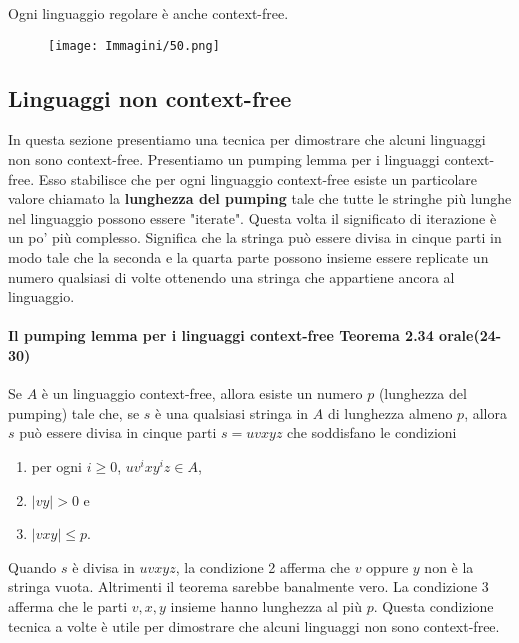 \documentclass{article}
\begin{document}
\begin{tcolorbox}[colback=blue!10!white, colframe=blue!50!black, title=Corollario 2.32]
    Ogni linguaggio regolare è anche context-free.
\end{tcolorbox}

\begin{figure}[H]
    \centering
    \texttt{[image: Immagini/50.png]}
    \label{fig:your_image}
\end{figure}

\subsection{Linguaggi non context-free}

In questa sezione presentiamo una tecnica per dimostrare che alcuni linguaggi non sono context-free.
Presentiamo un pumping lemma per i linguaggi context-free.
Esso stabilisce che per ogni linguaggio context-free esiste un particolare valore chiamato la \textbf{lunghezza del pumping} tale che tutte le stringhe più lunghe nel linguaggio possono essere "iterate".
Questa volta il significato di iterazione è un po' più complesso.
Significa che la stringa può essere divisa in cinque parti in modo tale che la seconda e la quarta parte possono insieme essere replicate un numero qualsiasi di volte ottenendo una stringa che appartiene ancora al linguaggio.

\paragraph{Il pumping lemma per i linguaggi context-free Teorema 2.34 orale(24-30)}
\text{ }

\begin{tcolorbox}[colback=yellow!10!white, colframe=yellow!50!black, title=Il pumping lemma per i linguaggi context-free]
    Se $A$ è un linguaggio context-free, allora esiste un numero $p$ (lunghezza del pumping) tale che, se $s$ è una qualsiasi stringa in $A$ di lunghezza almeno $p$, allora $s$ può essere divisa in cinque parti $s = uvxyz$ che soddisfano le condizioni
    \begin{enumerate}
        \item per ogni $i \geq 0$, $uv^ixy^iz \in A$,
        \item $|vy| > 0$ e
        \item $|vxy| \leq p$.
    \end{enumerate}
    Quando $s$ è divisa in $uvxyz$, la condizione 2 afferma che $v$ oppure $y$ non è la stringa vuota.
    Altrimenti il teorema sarebbe banalmente vero.
    La condizione 3 afferma che le parti $v,x,y$ insieme hanno lunghezza al più $p$.
    Questa condizione tecnica a volte è utile per dimostrare che alcuni linguaggi non sono context-free.
\end{tcolorbox}
\end{document}
